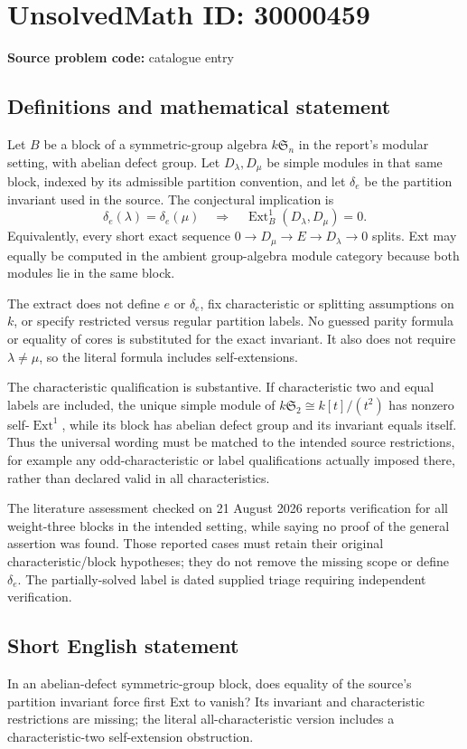 \documentclass[11pt]{article}
\begin{document}
\section*{UnsolvedMath ID: 30000459}
\textbf{Source problem code:} catalogue entry
\subsection{Definitions and mathematical statement}
Let $B$ be a block of a symmetric-group algebra $k\mathfrak S_n$ in the report's modular setting, with abelian defect group. Let $D_\lambda,D_\mu$ be simple modules in that same block, indexed by its admissible partition convention, and let $\delta_e$ be the partition invariant used in the source. The conjectural implication is
\[
 \delta_e(\lambda)=\delta_e(\mu)
 \quad\Longrightarrow\quad
 \operatorname{Ext}^1_B(D_\lambda,D_\mu)=0.
\]
Equivalently, every short exact sequence $0\to D_\mu\to E\to D_\lambda\to0$ splits. Ext may equally be computed in the ambient group-algebra module category because both modules lie in the same block.

The extract does not define $e$ or $\delta_e$, fix characteristic or splitting assumptions on $k$, or specify restricted versus regular partition labels. No guessed parity formula or equality of cores is substituted for the exact invariant. It also does not require $\lambda\ne\mu$, so the literal formula includes self-extensions.

The characteristic qualification is substantive. If characteristic two and equal labels are included, the unique simple module of $k\mathfrak S_2\cong k[t]/(t^2)$ has nonzero self-$\operatorname{Ext}^1$, while its block has abelian defect group and its invariant equals itself. Thus the universal wording must be matched to the intended source restrictions, for example any odd-characteristic or label qualifications actually imposed there, rather than declared valid in all characteristics.

The literature assessment checked on 21 August 2026 reports verification for all weight-three blocks in the intended setting, while saying no proof of the general assertion was found. Those reported cases must retain their original characteristic/block hypotheses; they do not remove the missing scope or define $\delta_e$. The partially-solved label is dated supplied triage requiring independent verification.
\subsection{Short English statement}
In an abelian-defect symmetric-group block, does equality of the source's partition invariant force first Ext to vanish? Its invariant and characteristic restrictions are missing; the literal all-characteristic version includes a characteristic-two self-extension obstruction.
\end{document}
